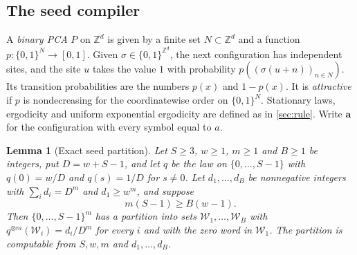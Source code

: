 \documentclass[11pt]{article}
\theoremstyle{plain}
\newtheorem{lemma}[theorem]{Lemma}
\theoremstyle{definition}
\theoremstyle{remark}
\newcommand{\Z}{\mathbb Z}
\begin{document}
\subsection{The seed compiler}

A \emph{binary PCA} $P$ on $\Z^d$ is given by a finite set $N\subset\Z^d$ and a function $p\colon\{0,1\}^N\to[0,1]$. Given $\sigma\in\{0,1\}^{\Z^d}$, the next configuration has independent sites, and the site $u$ takes the value $1$ with probability $p((\sigma(u+n))_{n\in N})$. Its transition probabilities are the numbers $p(x)$ and $1-p(x)$. It is \emph{attractive} if $p$ is nondecreasing for the coordinatewise order on $\{0,1\}^N$. Stationary laws, ergodicity and uniform exponential ergodicity are defined as in \cref{sec:rule}. Write $\mathbf a$ for the configuration with every symbol equal to $a$.

\begin{lemma}[Exact seed partition]\label{lem:seed-partition}
Let $S\geq3$, $w\geq1$, $m\geq1$ and $B\geq1$ be integers, put $D=w+S-1$, and let $q$ be the law on $\{0,\ldots,S-1\}$ with $q(0)=w/D$ and $q(s)=1/D$ for $s\neq0$. Let $d_1,\ldots,d_B$ be nonnegative integers with $\sum_id_i=D^m$ and $d_1\geq w^m$, and suppose
\begin{equation}\label{eq:coin}
 m(S-1)\geq B(w-1).
\end{equation}
Then $\{0,\ldots,S-1\}^m$ has a partition into sets $\mathcal W_1,\ldots,\mathcal W_B$ with $q^{\otimes m}(\mathcal W_i)=d_i/D^m$ for every $i$ and with the zero word in $\mathcal W_1$. The partition is computable from $S,w,m$ and $d_1,\ldots,d_B$.
\end{lemma}
\end{document}
